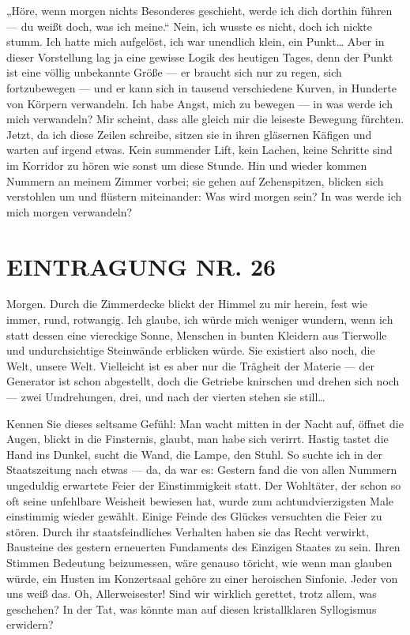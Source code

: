 „Höre, wenn morgen nichts Besonderes geschieht, werde ich dich
dorthin führen — du weißt doch, was ich meine.“ Nein, ich wusste es
nicht, doch ich nickte stumm. Ich hatte mich aufgelöst, ich war
unendlich klein, ein Punkt\ldots{} Aber in dieser Vorstellung lag ja
eine gewisse Logik des heutigen Tages, denn der Punkt ist eine
völlig unbekannte Größe — er braucht sich nur zu regen, sich
fortzubewegen — und er kann sich in tausend verschiedene Kurven, in
Hunderte von Körpern verwandeln. Ich habe Angst, mich zu bewegen —
in was werde ich mich verwandeln? Mir scheint, dass alle gleich mir
die leiseste Bewegung fürchten. Jetzt, da ich diese Zeilen
schreibe, sitzen sie in ihren gläsernen Käfigen und warten auf
irgend etwas. Kein summender Lift, kein Lachen, keine Schritte sind
im Korridor zu hören wie sonst um diese Stunde. Hin und wieder
kommen Nummern an meinem Zimmer vorbei; sie gehen auf Zehenspitzen,
blicken sich verstohlen um und flüstern miteinander: Was wird
morgen sein? In was werde ich mich morgen verwandeln?

\section{EINTRAGUNG NR. 26}

Morgen. Durch die Zimmerdecke blickt der Himmel zu mir herein, fest
wie immer, rund, rotwangig. Ich glaube, ich würde mich weniger
wundern, wenn ich statt dessen eine viereckige Sonne, Menschen in
bunten Kleidern aus Tierwolle und undurchsichtige Steinwände
erblicken würde. Sie existiert also noch, die Welt, unsere Welt.
Vielleicht ist es aber nur die Trägheit der Materie — der Generator
ist schon abgestellt, doch die Getriebe knirschen und drehen sich
noch — zwei Umdrehungen, drei, und nach der vierten stehen sie
still\ldots{}

Kennen Sie dieses seltsame Gefühl: Man wacht mitten in der Nacht
auf, öffnet die Augen, blickt in die Finsternis, glaubt, man habe
sich verirrt. Hastig tastet die Hand ins Dunkel, sucht die Wand,
die Lampe, den Stuhl. So suchte ich in der Staatszeitung nach etwas
— da, da war es: Gestern fand die von allen Nummern ungeduldig
erwartete Feier der Einstimmigkeit statt. Der Wohltäter, der schon
so oft seine unfehlbare Weisheit bewiesen hat, wurde zum
achtundvierzigsten Male einstimmig wieder gewählt. Einige Feinde
des Glückes versuchten die Feier zu stören. Durch ihr
staatsfeindliches Verhalten haben sie das Recht verwirkt, Bausteine
des gestern erneuerten Fundaments des Einzigen Staates zu sein.
Ihren Stimmen Bedeutung beizumessen, wäre genauso töricht, wie wenn
man glauben würde, ein Husten im Konzertsaal gehöre zu einer
heroischen Sinfonie. Jeder von uns weiß das. Oh, Allerweisester!
Sind wir wirklich gerettet, trotz allem, was geschehen? In der Tat,
was könnte man auf diesen kristallklaren Syllogismus erwidern?

